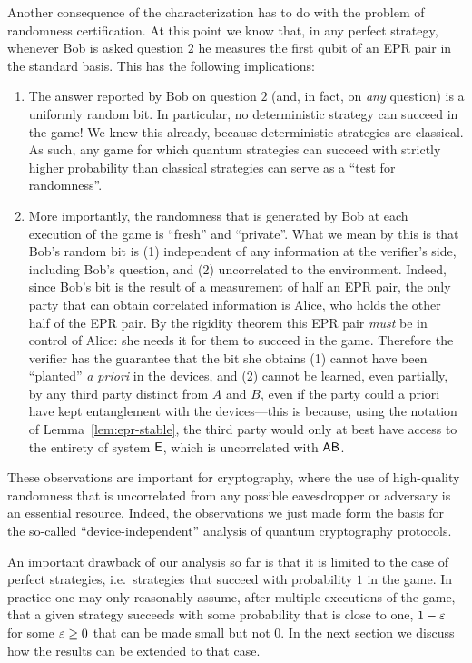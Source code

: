 Another consequence of the characterization has to do with the problem of randomness certification. At this point we know that, in any perfect strategy, whenever Bob is asked question $2$ he measures the first qubit of an EPR pair in the standard basis. This has the following implications:
\begin{enumerate}
\item The answer reported by Bob on question $2$ (and, in fact, on \emph{any} question) is a uniformly random bit. In particular, no deterministic strategy can succeed in the game! We knew this already, because deterministic strategies are classical. As such, any game for which quantum strategies can succeed with strictly higher probability than classical strategies can serve as a ``test for randomness''.
\item More importantly, the randomness that is generated by Bob at each execution of the game is ``fresh'' and ``private''. What we mean by this is that Bob's random bit is (1) independent of any information at the verifier's side, including Bob's question, and (2) uncorrelated to the environment. Indeed, since Bob's bit is the result of a measurement of half an EPR pair, the only party that can obtain correlated information is Alice, who holds the other half of the EPR pair. By the rigidity theorem this EPR pair \emph{must} be in control of Alice: she needs it for them to succeed in the game. Therefore the verifier has the guarantee that the bit she obtains (1) cannot have been ``planted'' \emph{a priori} in the devices, and (2) cannot be learned, even partially, by any third party distinct from $A$ and $B$, even if the party could a priori have kept entanglement with the devices---this is because, using the notation of Lemma~\ref{lem:epr-stable}, the third party would only at best have access to the entirety of system ${\textsf{E}}$, which is uncorrelated with ${\textsf{AB}}$. 
\end{enumerate}
These observations are important for cryptography, where the use of high-quality randomness that is uncorrelated from any possible eavesdropper or adversary is an essential resource. Indeed, the observations we just made form the basis for the so-called ``device-independent'' analysis of quantum cryptography protocols. 



An important drawback of our analysis so far is that it is limited to the case of perfect strategies, i.e.\ strategies that succeed with probability $1$ in the game. In practice one may only reasonably assume, after multiple executions of the game, that a given strategy succeeds with some probability that is close to one, $1-\varepsilon$ for some $\varepsilon\geq 0$ that can be made small but not $0$. In the next section we discuss how the results can be extended to that case. 

